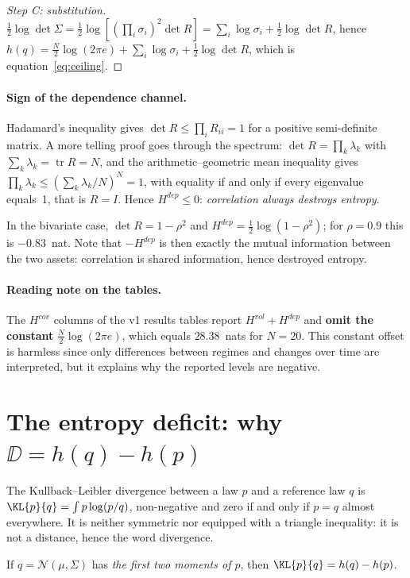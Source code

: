 \begin{proof}[Step C: substitution]
$\tfrac12\log\det\Sigma
=\tfrac12\log\!\left[\left(\prod_i\sigma_i\right)^2\det R\right]
=\sum_i\log\sigma_i+\tfrac12\log\det R$, hence
$h(q)=\tfrac N2\log(2\pi e)+\sum_i\log\sigma_i+\tfrac12\log\det R$, which is
equation~\eqref{eq:ceiling}.
\end{proof}

\paragraph{Sign of the dependence channel.} Hadamard's inequality gives
$\det R\le\prod_i R_{ii}=1$ for a positive semi-definite matrix. A more telling
proof goes through the spectrum: $\det R=\prod_k\lambda_k$ with
$\sum_k\lambda_k=\operatorname{tr}R=N$, and the arithmetic--geometric mean
inequality gives $\prod_k\lambda_k\le\left(\sum_k\lambda_k/N\right)^N=1$, with
equality if and only if every eigenvalue equals~1, that is $R=I$. Hence
$H^{dep}\le0$: \emph{correlation always destroys entropy}.

In the bivariate case, $\det R=1-\rho^2$ and $H^{dep}=\tfrac12\log(1-\rho^2)$;
for $\rho=0.9$ this is $-0.83$~nat. Note that $-H^{dep}$ is then exactly the
mutual information between the two assets: correlation is shared information,
hence destroyed entropy.

\paragraph{Reading note on the tables.} The $H^{cov}$ columns of the v1 results
tables report $H^{vol}+H^{dep}$ and \textbf{omit the constant}
$\tfrac N2\log(2\pi e)$, which equals $28.38$~nats for $N=20$. This constant
offset is harmless since only differences between regimes and changes over time
are interpreted, but it explains why the reported levels are negative.

\section{The entropy deficit: why $\DD=h(q)-h(p)$}
\label{app:deficit}

The Kullback--Leibler divergence between a law $p$ and a reference law $q$ is
$\KL{p}{q}=\int p\log(p/q)$, non-negative and zero if and only if $p=q$ almost
everywhere. It is neither symmetric nor equipped with a triangle inequality: it
is not a distance, hence the word divergence.

\begin{proposition}
\label{prop:deficit}
If $q=\mathcal N(\mu,\Sigma)$ has \emph{the first two moments of $p$}, then
$\KL{p}{q}=h(q)-h(p)$.
\end{proposition}

